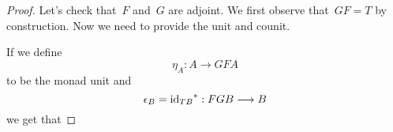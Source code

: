 \documentclass[../TFG.tex]{subfiles}
\begin{document}
\begin{proof}
    Let's check that~\(F\) and~\(G\) are adjoint. We first observe
    that~\(GF=T\) by construction. Now we need to provide the unit and
    counit.

    If we define
    \[
        \eta_{A} : A \longrightarrow GF A
    \]
    to be the monad unit and
    \[
        \epsilon_{B} = {\mathrm{id}_{TB}}^{\ast} : FG B \longrightarrow B
    \]
    we get that








\end{proof}

\end{document}
